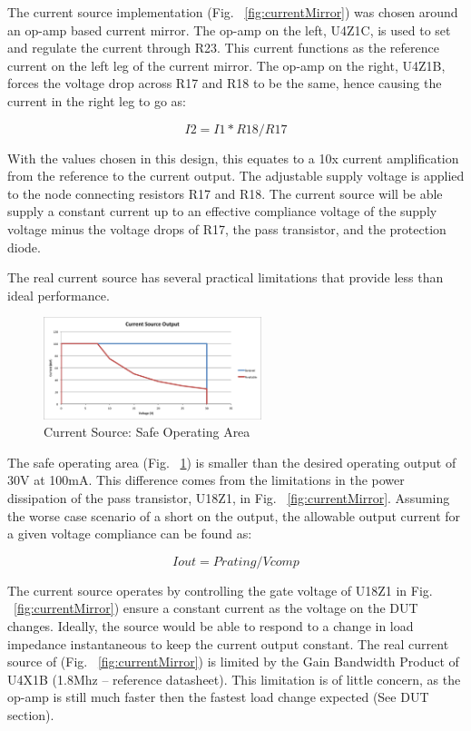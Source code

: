 \documentclass[journal]{IEEEtran}
\begin{document}
The current source implementation (Fig. ~\ref{fig:currentMirror}) was chosen around an op-amp based current mirror. The op-amp on the left, U4Z1C, is used to set and regulate the current through R23. This current functions as the reference current on the left leg of the current mirror. The op-amp on the right, U4Z1B, forces the voltage drop across R17 and R18 to be the same, hence causing the current in the right leg to go as:

\begin{equation}
I2 = I1*R18/R17
\end{equation}

With the values chosen in this design, this equates to a 10x current amplification from the reference to the current output. The adjustable supply voltage is applied to the node connecting resistors R17 and R18. The current source will be able supply a constant current up to an effective compliance voltage of the supply voltage minus the voltage drops of R17, the pass transistor, and the protection diode.

The real current source has several practical limitations that provide less than ideal performance. 

 
\begin{figure}[here]
\centering
\includegraphics[width=2.5in]{safeOpArea}
\caption{Current Source: Safe Operating Area}
\label{fig:safeOpArea}
\end{figure}

The safe operating area (Fig.  ~\ref{fig:safeOpArea}) is smaller than the desired operating output of 30V at 100mA. This difference comes from the limitations in the power dissipation of the pass transistor, U18Z1, in Fig. ~\ref{fig:currentMirror}. Assuming the worse case scenario of a short on the output, the allowable output current for a given voltage compliance can be found as:

\begin{equation}
Iout = Prating / Vcomp
\end{equation}

The current source operates by controlling the gate voltage of U18Z1 in Fig. ~\ref{fig:currentMirror}) ensure a constant current as the voltage on the DUT changes. Ideally, the source would be able to respond to a change in load impedance instantaneous to keep the current output constant. The real current source of (Fig. ~\ref{fig:currentMirror}) is limited by the Gain Bandwidth Product of U4X1B (1.8Mhz – reference datasheet). This limitation is of little concern, as the op-amp is still much faster then the fastest load change expected (See DUT section).
\end{document}

